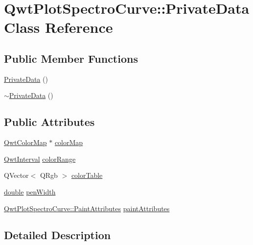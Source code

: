 \hypertarget{class_qwt_plot_spectro_curve_1_1_private_data}{\section{Qwt\-Plot\-Spectro\-Curve\-:\-:Private\-Data Class Reference}
\label{class_qwt_plot_spectro_curve_1_1_private_data}
}
\subsection*{Public Member Functions}
\begin{DoxyCompactItemize}
\item 
\hyperlink{class_qwt_plot_spectro_curve_1_1_private_data_abc4e6e9d61a2d8e71dc288984d1400ac}{Private\-Data} ()
\item 
\hyperlink{class_qwt_plot_spectro_curve_1_1_private_data_aaf15bf39b90494279bf249f825d69c6d}{$\sim$\-Private\-Data} ()
\end{DoxyCompactItemize}
\subsection*{Public Attributes}
\begin{DoxyCompactItemize}
\item 
\hyperlink{class_qwt_color_map}{Qwt\-Color\-Map} $\ast$ \hyperlink{class_qwt_plot_spectro_curve_1_1_private_data_a486ecd36a51b89d01bd0c55a6d780056}{color\-Map}
\item 
\hyperlink{class_qwt_interval}{Qwt\-Interval} \hyperlink{class_qwt_plot_spectro_curve_1_1_private_data_a72415fa72a4fe4f9aa93553743eb1b79}{color\-Range}
\item 
Q\-Vector$<$ Q\-Rgb $>$ \hyperlink{class_qwt_plot_spectro_curve_1_1_private_data_aaaf9c9aba91c94c80a6cb98270e7cc03}{color\-Table}
\item 
\hyperlink{_super_l_u_support_8h_a8956b2b9f49bf918deed98379d159ca7}{double} \hyperlink{class_qwt_plot_spectro_curve_1_1_private_data_abd73307d41624cf4bd87b78eb84c2219}{pen\-Width}
\item 
\hyperlink{class_qwt_plot_spectro_curve_a78b3bf4c7d055f2f00bd371e9ddc4f2f}{Qwt\-Plot\-Spectro\-Curve\-::\-Paint\-Attributes} \hyperlink{class_qwt_plot_spectro_curve_1_1_private_data_a435f58459ac70eaea2d394af72d5d755}{paint\-Attributes}
\end{DoxyCompactItemize}


\subsection{Detailed Description}


